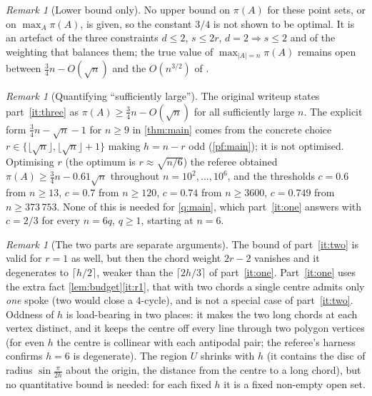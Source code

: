 \documentclass[11pt,a4paper]{article}
\theoremstyle{plain}
\theoremstyle{definition}
\theoremstyle{remark}
\newtheorem{remark}[theorem]{Remark}
\newcommand{\pipath}{\pi}
\newcommand{\dP}{d}
\newcommand{\sP}{s}
\begin{document}
\begin{remark}[Lower bound only]\label{rem:upper}
No upper bound on $\pipath(A)$ for these point sets, or on $\max_A\pipath(A)$, is given, so the constant $3/4$ is not shown to be optimal. It is an artefact of the three constraints $\dP\le2$, $\sP\le2r$, $\dP=2\Rightarrow\sP\le2$ and of the weighting that balances them; the true value of $\max_{|A|=n}\pipath(A)$ remains open between $\tfrac34n-O(\sqrt n)$ and the $O(n^{3/2})$ of \cite{DPSS26}.
\end{remark}

\begin{remark}[Quantifying ``sufficiently large'']\label{rem:quant}
The original writeup states part~\ref{it:three} as $\pipath(A)\ge\tfrac34n-O(\sqrt n)$ for all sufficiently large $n$. The explicit form $\tfrac34n-\sqrt n-1$ for $n\ge9$ in \cref{thm:main} comes from the concrete choice $r\in\{\lfloor\sqrt n\rfloor,\lfloor\sqrt n\rfloor+1\}$ making $h=n-r$ odd (\cref{pf:main}); it is not optimised. Optimising $r$ (the optimum is $r\approx\sqrt{n/6}$) the referee obtained $\pipath(A)\ge\tfrac34n-0.61\sqrt n$ throughout $n=10^2,\dots,10^6$, and the thresholds $c=0.6$ from $n\ge13$, $c=0.7$ from $n\ge120$, $c=0.74$ from $n\ge3600$, $c=0.749$ from $n\ge373\,753$. None of this is needed for \cref{q:main}, which part~\ref{it:one} answers with $c=2/3$ for every $n=6q$, $q\ge1$, starting at $n=6$.
\end{remark}

\begin{remark}[The two parts are separate arguments]\label{rem:r1}
The bound of part~\ref{it:two} is valid for $r=1$ as well, but then the chord weight $2r-2$ vanishes and it degenerates to $\lceil h/2\rceil$, weaker than the $\lceil2h/3\rceil$ of part~\ref{it:one}. Part~\ref{it:one} uses the extra fact \cref{lem:budget}\ref{it:r1}, that with two chords a single centre admits only \emph{one} spoke (two would close a $4$-cycle), and is not a special case of part~\ref{it:two}. Oddness of $h$ is load-bearing in two places: it makes the two long chords at each vertex distinct, and it keeps the centre off every line through two polygon vertices (for even $h$ the centre is collinear with each antipodal pair; the referee's harness confirms $h=6$ is degenerate). The region $U$ shrinks with $h$ (it contains the disc of radius $\sin\frac{\pi}{2h}$ about the origin, the distance from the centre to a long chord), but no quantitative bound is needed: for each fixed $h$ it is a fixed non-empty open set.
\end{remark}
\end{document}
